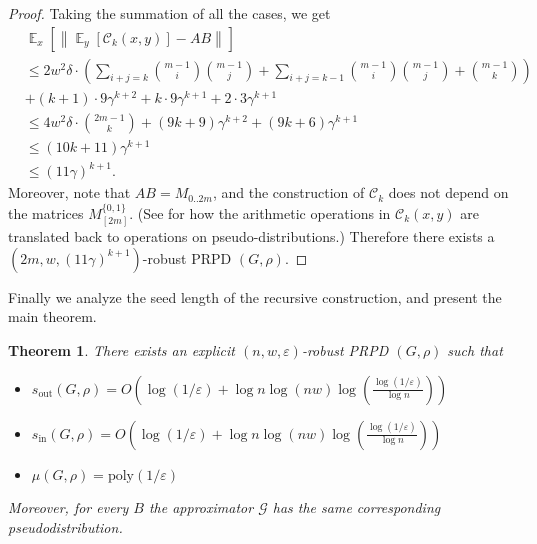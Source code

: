 \documentclass[10pt,a4paper]{article}
\newtheorem{theorem}{Theorem}
\DeclareMathOperator*{\Ex}{\mathbb E}
\newcommand{\ex}[2][]{\Ex_{#1}\left[#2\right]}
\newcommand{\norm}[2][]{\left\|#2\right\|_{#1}}
\newcommand{\cC}{\mathcal C}
\newcommand{\cG}{\mathcal G}
\newcommand{\bit}{\{0,1\}}
\newcommand{\eps}{\varepsilon}
\newcommand{\wt}{\mu}
\newcommand{\poly}{\mathrm{poly}}
\newcommand{\sout}[1][]{s_{\mathrm{out}#1}}
\newcommand{\si}[1][]{s_{\mathrm{in}#1}}
\begin{document}
\begin{proof}
Taking the summation of all the cases, we get 
\begin{align*}
&\ex[x]{\norm{\ex[y]{\cC_k(x,y)}-AB}}\\
&\le 2w^2\delta\cdot\left(\sum_{i+j=k}\binom{m-1}{i}\binom{m-1}{j}+\sum_{i+j=k-1}\binom{m-1}{i}\binom{m-1}{j}+\binom{m-1}{k}\right)\\
&+ (k+1)\cdot 9\gamma^{k+2}+ k\cdot 9\gamma^{k+1} + 2\cdot 3\gamma^{k+1} \\
&\le 4w^2\delta \cdot \binom{2m-1}{k} + (9k+9)\gamma^{k+2} + (9k+6)\gamma^{k+1}\\
&\le (10k+11)\gamma^{k+1}\\
&\le (11\gamma)^{k+1}.
\end{align*}
Moreover, note that $AB=M_{0..2m}$, and the construction of $\cC_k$ does not depend on the matrices $M_{[2m]}^{\bit}$. (See  for how the arithmetic operations in $\cC_k(x,y)$ are translated back to operations on pseudo-distributions.) Therefore there exists a $(2m,w,(11\gamma)^{k+1})$-robust PRPD $(G,\rho)$. 
\end{proof}
\noindent
Finally we analyze the seed length of the recursive construction, and present the main theorem.
\begin{theorem}
There exists an explicit $(n,w,\eps)$-robust PRPD $(G,\rho)$ such that 
\begin{itemize}
\item 
$\sout(G,\rho)= O\left(\log(1/\eps)+ \log n \log (nw)\log\left(\frac{\log(1/\eps)}{\log n}\right)\right)$
\item
$\si(G,\rho)= O\left(\log(1/\eps)+ \log n \log (nw)\log\left(\frac{\log(1/\eps)}{\log n}\right)\right)$
\item
$\wt(G,\rho)=\poly(1/\eps)$
\end{itemize}
Moreover, for every $B$ the approximator $\cG$ has the same corresponding pseudodistribution.
\end{theorem}
\end{document}

